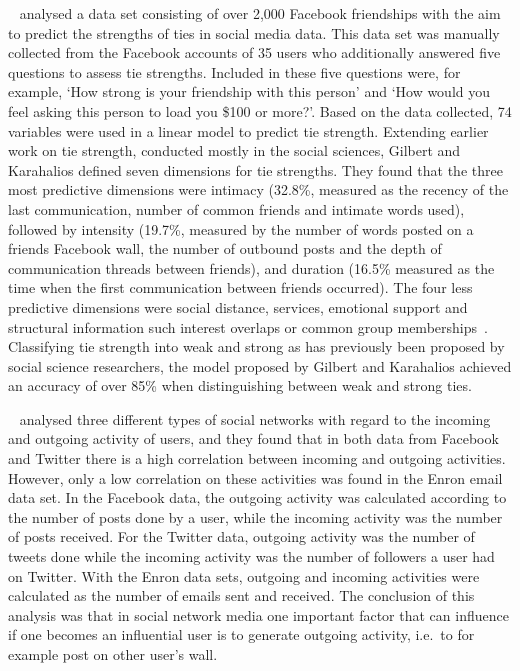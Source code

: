 \documentclass[letterpaper]{article}
\begin{document}
~\cite{gilbert2009predicting} analysed a data set consisting of over 2,000 Facebook friendships with the aim to predict the strengths of ties in social media data. This data set was manually collected from the Facebook accounts of 35 users who additionally answered five questions to assess tie strengths. Included in these five questions were, for example, `How strong is your friendship with this person' and `How would you feel asking this person to load you \$100 or more?'. Based on the data collected, 74 variables were used in a linear model to predict tie strength. Extending earlier work on tie strength, conducted mostly in the social sciences, Gilbert and Karahalios defined seven dimensions for tie strengths. They found that the three most predictive dimensions were intimacy (32.8\%, measured as the recency of the last communication, number of common friends and intimate words used), followed by intensity (19.7\%, measured by the number of words posted on a friends Facebook wall, the number of outbound posts and the depth of communication threads between friends), and duration (16.5\% measured as the time when the first communication between friends occurred). The four less predictive dimensions were social distance, services, emotional support and structural information such interest overlaps or common group memberships~\cite{gilbert2009predicting}. Classifying tie strength into weak and strong as has previously been proposed by social science researchers, the model proposed by Gilbert and Karahalios achieved an accuracy of over 85\% when distinguishing between weak and strong ties.


~\cite{saez2011high} analysed three different types of social networks with regard to the incoming and outgoing activity of users, and they found that in both data from Facebook and Twitter there is a high correlation between incoming and outgoing activities. However, only a low correlation on these activities was found in the Enron email data set. In the Facebook data, the outgoing activity was calculated according to the number of posts done by a user, while the incoming activity was the number of posts received. For the Twitter data, outgoing activity was the number of tweets done while the incoming activity was the number of followers a user had on Twitter. With the Enron data sets, outgoing and incoming activities were calculated as the number of emails sent and received. The conclusion of this analysis was that in social network media one important factor that can influence if one becomes an influential user is to generate outgoing activity, i.e.\ to for example post on other user's wall.
\end{document}
